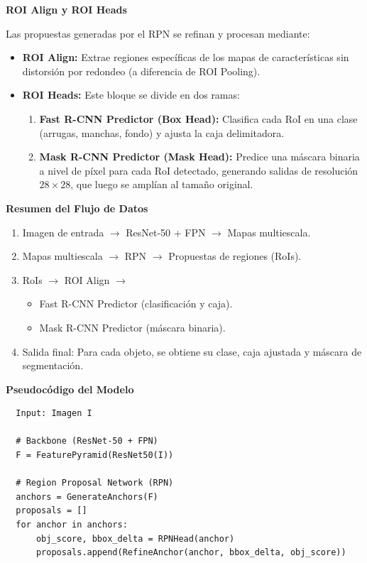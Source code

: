 \begin{enumerate}
\begin{itemize}
\textbf{ROI Align y ROI Heads}

Las propuestas generadas por el RPN se refinan y procesan mediante:
\begin{itemize}
    \item \textbf{ROI Align:} Extrae regiones específicas de los mapas de características sin distorsión por redondeo (a diferencia de ROI Pooling).
    \item \textbf{ROI Heads:} Este bloque se divide en dos ramas:
    \begin{enumerate}
        \item \textbf{Fast R-CNN Predictor (Box Head):} 
        Clasifica cada RoI en una clase (arrugas, manchas, fondo) y ajusta la caja delimitadora.
        \item \textbf{Mask R-CNN Predictor (Mask Head):}
        Predice una máscara binaria a nivel de píxel para cada RoI detectado, generando salidas de resolución $28 \times 28$, que luego se amplían al tamaño original.
    \end{enumerate}
\end{itemize}

\textbf{Resumen del Flujo de Datos}

\begin{enumerate}
    \item Imagen de entrada $\rightarrow$ ResNet-50 + FPN $\rightarrow$ Mapas multiescala.
    \item Mapas multiescala $\rightarrow$ RPN $\rightarrow$ Propuestas de regiones (RoIs).
    \item RoIs $\rightarrow$ ROI Align $\rightarrow$ 
    \begin{itemize}
        \item Fast R-CNN Predictor (clasificación y caja).
        \item Mask R-CNN Predictor (máscara binaria).
    \end{itemize}
    \item Salida final: Para cada objeto, se obtiene su clase, caja ajustada y máscara de segmentación.
\end{enumerate}

\textbf{Pseudocódigo del Modelo}
\begin{verbatim}
  Input: Imagen I
  
  # Backbone (ResNet-50 + FPN)
  F = FeaturePyramid(ResNet50(I))  
  
  # Region Proposal Network (RPN)
  anchors = GenerateAnchors(F)         
  proposals = []
  for anchor in anchors:
      obj_score, bbox_delta = RPNHead(anchor)  
      proposals.append(RefineAnchor(anchor, bbox_delta, obj_score))
  

\end{verbatim}
\end{itemize}
\end{enumerate}
